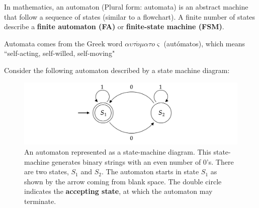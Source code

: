\begin{Def}

    In mathematics, an automaton (Plural form: automata) is an abstract machine that follow a sequence of states (similar to a 
    flowchart). A finite number of states describe a \textbf{finite automaton (FA)} or \textbf{finite-state machine (FSM)}.
    \end{Def}

\begin{Tip}
    Automata comes from the Greek word $\alpha\upsilon\tau\acute{o}\mu\alpha\tau o\varsigma$ (autómatos), which means ``self-acting, self-willed, self-moving"
\end{Tip}

\newpage 


\noindent
Consider the following automaton described by a state machine diagram:

\begin{figure}[h]
    \centering
    \includegraphics[width=\textwidth]{Sections/Parse/state.png}
    \caption{An automaton represented as a state-machine diagram. This state-machine generates binary strings with an even number of 0's.
    There are two states, $S_1$ and $S_2$. The automaton starts in state $S_1$ as shown by the arrow coming from blank space. The double
    circle indicates the \textbf{accepting state}, at which the automaton may terminate.}
    \label{fig:fa}
\end{figure}

